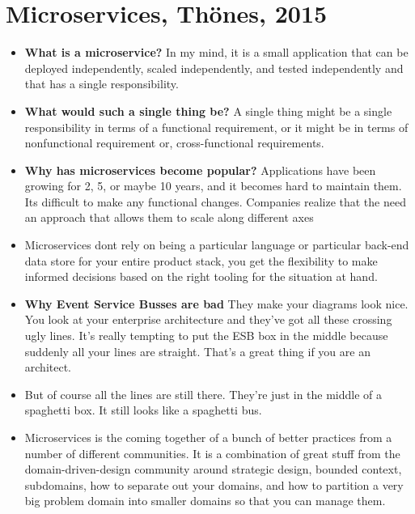 \section{Microservices, Thönes, 2015}

\begin{itemize}
  \item \textbf{What is a microservice?} In my mind, it is a small application that can be deployed independently, scaled independently, and tested independently and that has a single responsibility.
  \item \textbf{What would such a single thing be?} A single thing might be a single responsibility in terms of a functional requirement, or it might be in terms of nonfunctional requirement or, cross-functional requirements.
  \item \textbf{Why has microservices become popular?} Applications have been growing for 2, 5, or maybe 10 years, and it becomes hard to maintain them. Its difficult to make any functional changes. Companies realize that the need an approach that allows them to scale along different axes
  \item Microservices dont rely on being a particular language or particular back-end data store for your entire product stack, you get the flexibility to make informed decisions based on the right tooling for the situation at hand.
  \item \textbf{Why Event Service Busses are bad} They make your diagrams look nice. You look at your enterprise architecture and they've got all these crossing ugly lines. It's really tempting to put the ESB box in the middle because suddenly all your lines are straight. That's a great thing if you are an architect.
  \item But of course all the lines are still there. They're just in the middle of a spaghetti box. It still looks like a spaghetti bus.
  \item Microservices is the coming together of a bunch of better practices from a number of different communities. It is a combination of great stuff from the domain-driven-design community around strategic design, bounded context, subdomains, how to separate out your domains, and how to partition a very big problem domain into smaller domains so that you can manage them.
\end{itemize}

